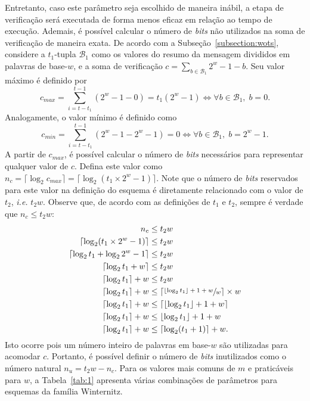\documentclass[12pt,notitlepage]{report}
\begin{document}
Entretanto, caso este parâmetro seja escolhido de maneira inábil, a etapa de verificação será executada de forma menos eficaz em relação ao tempo de execução. Ademais, é possível calcular o número de \emph{bits} não utilizados na soma de verificação de maneira exata. De acordo com a Subseção~\ref{subsection:wots}, considere a $t_1$-tupla $\mathcal{B}_1$ como os valores do resumo da mensagem divididos em palavras de base-$w$, e a soma de verificação $c = \sum_{b \in \mathcal{B}_1} 2^w - 1 - b$. Seu valor máximo é definido por
\begin{equation}
c_{max} = \sum_{i = t - t_1}^{t - 1} (2^w - 1 - 0) = t_1(2^w - 1) \iff \forall b \in \mathcal{B}_1, \; b = 0.
\end{equation}
Analogamente, o valor mínimo é definido como
\begin{equation}
c_{min} = \sum_{i = t - t_1}^{t - 1} (2^w - 1 - 2^w - 1) = 0 \iff \forall b \in \mathcal{B}_1, \; b = 2^w - 1.
\end{equation}
A partir de $c_{max}$, é possível calcular o número de \emph{bits} necessários para representar qualquer valor de $c$. Defina este valor como $n_c = \lceil \log_2 c_{max} \rceil = \lceil \log_2 (t_1 \times 2^w - 1) \rceil$. Note que o número de \emph{bits} reservados para este valor na definição do esquema é diretamente relacionado com o valor de $t_2$, \emph{i.e.} $t_2w$. Observe que, de acordo com as definições de $t_1$ e $t_2$, sempre é verdade que $n_c \leq t_2w$:
\begin{align}
\begin{split}
    n_c &\leq t_2 w \\
    \lceil \log_2 (t_1 \times 2^w - 1) \rceil &\leq t_2w \\
    \lceil \log_2 t_1 + \log_2 2^w - 1 \rceil &\leq t_2w \\
    \lceil \log_2 t_1 + w \rceil &\leq t_2w \\
    \lceil \log_2 t_1 \rceil + w &\leq t_2w \\
    \lceil \log_2 t_1 \rceil + w &\leq \left\lceil \sfrac{\lfloor \log_2 t_1 \rfloor + 1 + w}{w} \right\rceil \times w \\
    \lceil \log_2 t_1 \rceil + w &\leq \lceil \lfloor \log_2 t_1 \rfloor + 1 + w \rceil \\
    \lceil \log_2 t_1 \rceil + w &\leq \lfloor \log_2 t_1 \rfloor + 1 + w \\
    \lceil \log_2 t_1 \rceil + w &\leq \lceil \log_2 (t_1 + 1) \rceil + w.
\end{split}
\end{align}
Isto ocorre pois um número inteiro de palavras em base-$w$ são utilizadas para acomodar $c$. Portanto, é possível definir o número de \emph{bits} inutilizados como o número natural $n_u = t_2w - n_c$. Para os valores mais comuns de $m$ e praticáveis para $w$, a Tabela~\ref{tab:1} apresenta várias combinações de parâmetros para esquemas da família Winternitz.
\end{document}
